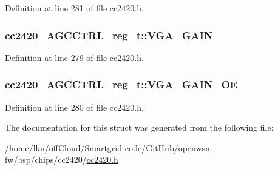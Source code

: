 Definition at line 281 of file cc2420.\+h.

\subsubsection[{\texorpdfstring{V\+G\+A\+\_\+\+G\+A\+IN}{VGA_GAIN}}]{ cc2420\+\_\+\+A\+G\+C\+C\+T\+R\+L\+\_\+reg\+\_\+t\+::\+V\+G\+A\+\_\+\+G\+A\+IN}\hypertarget{structcc2420___a_g_c_c_t_r_l__reg__t_a26798a7ce696996051d3c04197ccf319}{}\label{structcc2420___a_g_c_c_t_r_l__reg__t_a26798a7ce696996051d3c04197ccf319}


Definition at line 279 of file cc2420.\+h.

\subsubsection[{\texorpdfstring{V\+G\+A\+\_\+\+G\+A\+I\+N\+\_\+\+OE}{VGA_GAIN_OE}}]{ cc2420\+\_\+\+A\+G\+C\+C\+T\+R\+L\+\_\+reg\+\_\+t\+::\+V\+G\+A\+\_\+\+G\+A\+I\+N\+\_\+\+OE}\hypertarget{structcc2420___a_g_c_c_t_r_l__reg__t_a87fa564c144bbcf5602f83734c9ffb81}{}\label{structcc2420___a_g_c_c_t_r_l__reg__t_a87fa564c144bbcf5602f83734c9ffb81}


Definition at line 280 of file cc2420.\+h.



The documentation for this struct was generated from the following file\+:\begin{DoxyCompactItemize}
\item 
/home/lkn/off\+Cloud/\+Smartgrid-\/code/\+Git\+Hub/openwsn-\/fw/bsp/chips/cc2420/\hyperlink{cc2420_8h}{cc2420.\+h}\end{DoxyCompactItemize}
